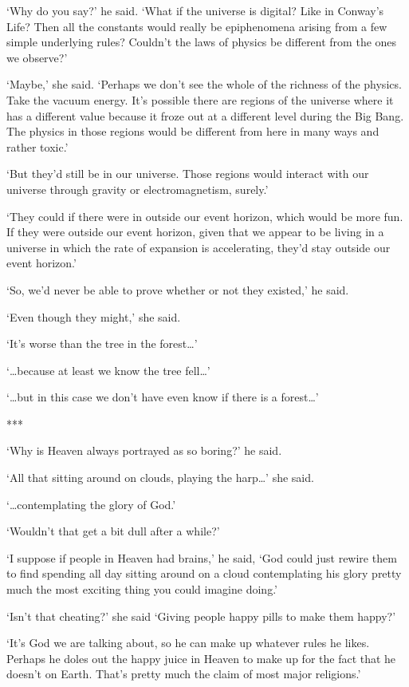 `Why do you say?' he said. `What if the universe is digital? Like in Conway's
Life? Then all the constants would really be epiphenomena arising
from a few simple underlying rules? Couldn't the laws of physics be different from the ones we observe?'

`Maybe,' she said. `Perhaps we don't see the whole of the richness of the
physics. Take the vacuum energy. It's possible there are
regions of the universe where it has a different value
because it froze out at a different level during the Big Bang. The
physics in those regions would be different from here in many
ways and rather toxic.'

`But they'd still be in our universe. Those regions would interact
with our universe through gravity or electromagnetism, surely.'

`They could if there were in outside our event horizon, which would
be more fun. If they were outside our event horizon, given that we
appear to be living in a universe in which the rate of expansion is
accelerating, they'd stay outside our event horizon.'

`So, we'd never be able to prove whether or not they existed,' he said.

`Even though they might,' she said.

`It's worse than the tree in the forest\dots'

`{\dots}because at least we know the tree fell\dots'

`{\dots}but in this case we don't have even know if there is a forest\dots'

***

`Why is Heaven always portrayed as so boring?' he said.

`All that sitting around on clouds, playing the harp{\dots}' she said.

`{\dots}contemplating the glory of God.'

`Wouldn't that get a bit dull after a while?'

`I suppose if people in Heaven had brains,' he said, `God could just rewire them to find spending all day sitting around on a cloud contemplating his glory pretty much the most exciting thing you could imagine doing.'

`Isn't that cheating?' she said `Giving people happy pills to make them happy?'

`It's God we are talking about, so he can make up whatever
rules he likes. Perhaps he doles out the happy juice in Heaven to
make up for the fact that he doesn't on Earth. That's pretty much
the claim of most major religions.'

